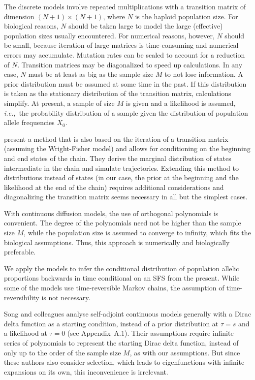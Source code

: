 \documentclass[preprint]{elsarticle}
\newcommand\ie{{\it i.e.,}}
\newcommand\x[1]{\ensuremath{X_{#1}}}
\begin{document}
The discrete models involve repeated multiplications with a transition matrix of dimension $(N+1)\times(N+1)$, where $N$ is the haploid population size. For biological reasons, $N$ should be taken large to model the large (effective) population sizes usually encountered. For numerical reasons, however, $N$ should be small, because iteration of large matrices is time-consuming and numerical errors may accumulate. Mutation rates can be scaled to account for a reduction of $N$. Transition matrices may be diagonalized to speed up calculations. In any case, $N$ must be at least as big as the sample size $M$ to not lose information. A prior distribution must be assumed at some time in the past. If this distribution is taken as the stationary distribution of the transition matrix, calculations simplify. At present, a sample of size $M$ is given and a likelihood is assumed, \ie\ the probability distribution of a sample given the distribution of population allele frequencies $\x{0}$.

\citet{Zhao14} present a method that is also based on the iteration of a transition matrix (assuming the Wright-Fisher model) and allows for conditioning on the beginning and end states of the chain. They derive the marginal distribution of states intermediate in the chain and simulate trajectories. Extending this method to distributions instead of states (in our case, the prior at the beginning and the likelihood at the end of the chain) requires additional considerations and diagonalizing the transition matrix seems necessary in all but the simplest cases. 

With continuous diffusion models, the use of orthogonal polynomials is convenient. The degree of the polynomials need not be higher than the sample size $M$, while the population size is assumed to converge to infinity, which fits the biological assumptions. Thus, this approach is numerically and biologically preferable. 

We apply the models to infer the conditional distribution of population allelic proportions backwards in time conditional on an SFS from the present. While some of the models use time-reversible Markov chains, the assumption of time-reversibility is not necessary.%

Song and colleagues \citep{Song12,Stei13,Stei14,Zivk15} analyse self-adjoint continuous models generally with a Dirac delta function as a starting condition, instead of a prior distribution at $\tau=s$ and a likelihood at $\tau=0$ (see Appendix~A.1). Their assumptions require infinite series of polynomials to represent the starting Dirac delta function, instead of only up to the order of the sample size $M$, as with our assumptions. But since these authors also consider selection, which leads to eigenfunctions with infinite expansions on its own, this inconvenience is irrelevant. 
\end{document}

